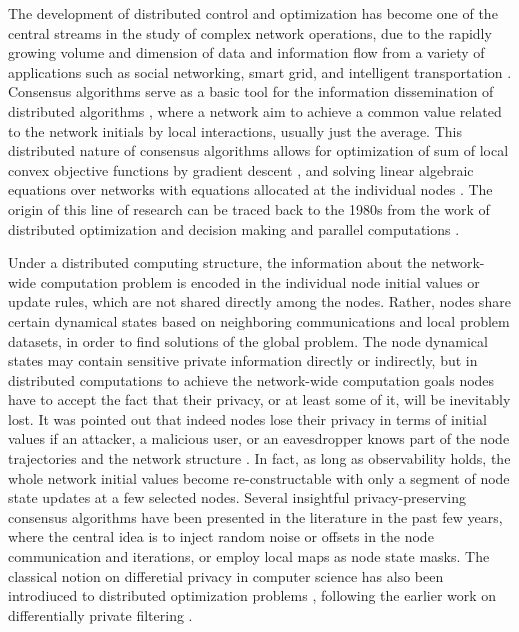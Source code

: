 \documentclass[a4paper, 11pt]{article}
\newcommand{\1}{\mathbf{1}}
\begin{document}
The development of distributed control and optimization  has become one of the central  streams in the study of complex network operations,  due to the rapidly growing volume and dimension of data and information flow from a variety of applications  such as social networking, smart grid, and intelligent transportation \cite{magnusbook,nedic09,nedic10,boyd2011distributed,xiaoming-formation,khan2009distributed}. Consensus algorithms serve as a basic tool for the information dissemination of distributed algorithms \cite{jad03,xiao04}, where  a network aim to achieve a common value related to the network initials by local interactions, usually just the average. This distributed nature of consensus algorithms allows for   optimization of sum of  local convex objective functions by gradient descent \cite{nedic10}, and  solving  linear algebraic equations over networks with equations allocated at the individual nodes   \cite{Mou-TAC-2015,Shi-TAC-2017}.
   The origin of this line of research can be traced back to the 1980s from the work of distributed optimization and decision making \cite{tsi} and parallel computations \cite{lynch}.





Under a distributed computing structure, the 
information about the network-wide computation problem is encoded in the individual node initial values or update rules, which are not shared directly among the nodes. Rather, nodes share certain dynamical states based on neighboring communications and local problem datasets, in order to find solutions of the global problem. The node dynamical states may contain sensitive private information directly or indirectly, but  in distributed computations to achieve the network-wide computation goals nodes   have to accept the fact that their privacy, or at least some of it, will be inevitably lost. It was pointed out that indeed nodes  lose their  privacy in terms of initial values if an attacker, a malicious user, or an eavesdropper knows part of the node trajectories and the network structure \cite{sundaram2007,yuan2013}. In fact, as long as observability holds, the whole network initial values become re-constructable with only a segment of node state updates at a few selected nodes.  Several insightful privacy-preserving consensus algorithms have been presented in the literature \cite{huang2012differentially,manitara2013privacy,mo2017privacy,nicolas2017,claudio2018} in the past few years, where the central idea is to inject  random noise or offsets in the node communication and iterations, or employ local maps as node state masks. The classical notion on differetial privacy in computer science has also been introdiuced to  distributed optimization problems   \cite{huang2015differentially,pappas2017}, following the earlier work on differentially private filtering \cite{pappas2014}. 
\end{document}
